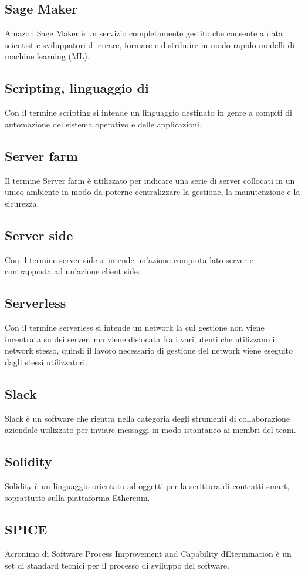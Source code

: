 \subsection{Sage Maker}  Amazon Sage Maker è un servizio completamente gestito che consente a data scientist e sviluppatori di creare, formare e distribuire in modo rapido modelli di machine learning (ML). 
\subsection{Scripting, linguaggio di}  Con il termine scripting si intende un linguaggio destinato in genre a compiti di automazione del sistema operativo e delle applicazioni.
\subsection{Server farm}  Il termine Server farm è utilizzato per indicare una serie di server collocati in un unico ambiente in modo da poterne centralizzare la gestione, la manutenzione e la sicurezza.
\subsection{Server side}  Con il termine server side si intende un'azione compiuta lato server e contrapposta ad un'azione client side.
\subsection{Serverless}  Con il termine serverless si intende un network la cui gestione non viene incentrata su dei server, ma viene dislocata fra i vari utenti che utilizzano il network stesso, quindi il lavoro necessario di gestione del network viene eseguito dagli stessi utilizzatori.
\subsection{Slack}  Slack è un software che rientra nella categoria degli strumenti di collaborazione aziendale utilizzato per inviare messaggi in modo istantaneo ai membri del team.
\subsection{Solidity}  Solidity è un linguaggio orientato ad oggetti per la scrittura di contratti smart, soprattutto sulla piattaforma Ethereum.
\subsection{SPICE}  Acronimo di Software Process Improvement and Capability dEtermination è un set di standard tecnici per il processo di sviluppo del software.
